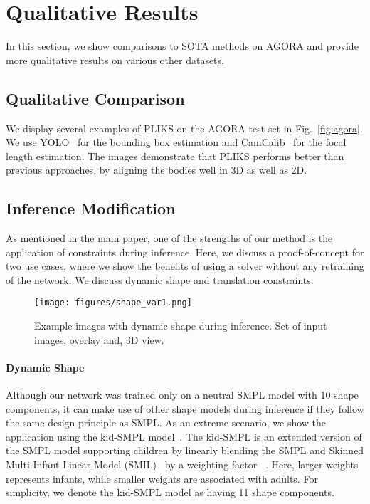 \documentclass[10pt,twocolumn,letterpaper]{article}
\begin{document}
\section{Qualitative Results}

In this section, we show comparisons to SOTA
methods on AGORA and provide more qualitative results on various other datasets.

\subsection{Qualitative Comparison}
We display several examples of PLIKS on the AGORA test set in Fig.~\ref{fig:agora}. We use YOLO~\cite{yolo} for the bounding box estimation and CamCalib~\cite{spec} for the focal length estimation. The images demonstrate that PLIKS performs better than previous approaches, by aligning the bodies well in 3D as well as 2D.  

\subsection{Inference Modification}
As mentioned in the main paper, one of the strengths of our method is the application of constraints during inference.
Here, we discuss a proof-of-concept for two use cases, where we show the benefits of using a solver without any retraining of the network. We discuss dynamic shape and translation constraints.


\begin{figure*}
\begin{center}
\texttt{[image: figures/shape\_var1.png]}
\end{center}
   \caption{Example images with dynamic shape during inference. Set of input images, overlay and, 3D view.}
\label{fig:fig_kid1}
\end{figure*}

\paragraph{Dynamic Shape}
Although our network was trained only on a neutral SMPL model with 10 shape components, it can make use of other shape models during inference if they follow the same design principle as SMPL. As an extreme scenario, we show the application using the kid-SMPL model~\cite{agora, bev}. The kid-SMPL is an extended version of the SMPL model supporting children by linearly blending the SMPL and  Skinned Multi-Infant Linear Model (SMIL)~\cite{siml} by a weighting factor ~\cite{agora}. Here, larger weights represents infants, while smaller weights are associated with adults. For simplicity, we denote the kid-SMPL model as having 11 shape components.
\end{document}
